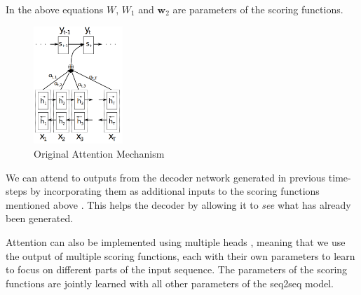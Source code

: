 \documentclass[12pt]{article}
\begin{document}
In the above equations \(W\), \(W_1\) and \(\bm{w}_2\) are parameters of the scoring functions.
\begin{figure}[H]
	\centering
	\includegraphics[width=0.3\textwidth]{pics/bahdanau_attn.png}
	\caption{Original Attention Mechanism \cite{Bahdanau:2014}}
	\label{fig:attentiona}
\end{figure}
We can attend to outputs from the decoder network generated in previous time-steps by incorporating them as additional inputs to the scoring functions mentioned above \cite{Shao:2017}. This helps the decoder by allowing it to \textit{see} what has already been generated.

Attention can also be implemented using multiple heads \cite{Vaswani:2017}, meaning that we use the output of multiple scoring functions, each with their own parameters to learn to focus on different parts of the input sequence. The parameters of the scoring functions are jointly learned with all other parameters of the seq2seq model.
\end{document}
